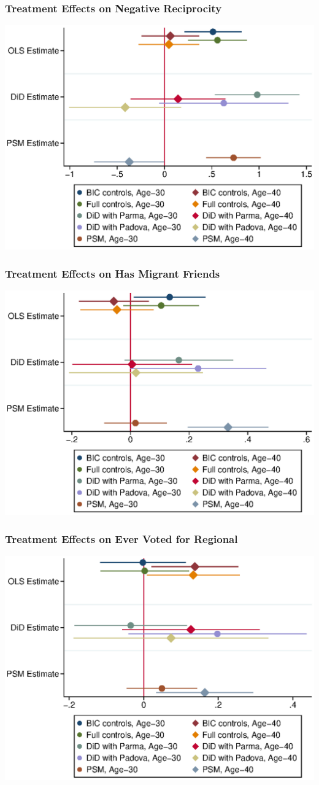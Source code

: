 \begin{frame}
	\frametitle{Treatment Effects on Negative Reciprocity} 
	\includegraphics[scale=0.8]{../../../output/image/coefplot-reciprocity2-adult.eps}

\end{frame}

\begin{frame}
	\frametitle{Treatment Effects on Has Migrant Friends} 
	\includegraphics[scale=0.8]{../../../output/image/coefplot-MigrFriend-adult.eps}

\end{frame}

\begin{frame}
	\frametitle{Treatment Effects on Ever Voted for Regional} 
	\includegraphics[scale=0.8]{../../../output/image/coefplot-votedRegional-adult.eps}

\end{frame}

